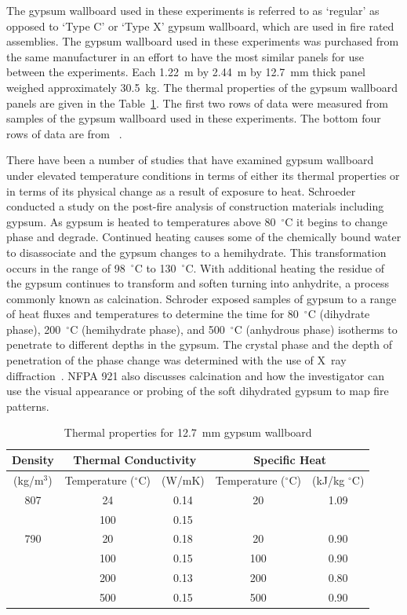 \documentclass[twoside]{uocthesis}
\begin{document}
{The gypsum wallboard used in these experiments is referred to as `regular' as opposed to `Type C' or `Type X' gypsum wallboard, which are used in fire rated assemblies. The gypsum wallboard used in these experiments was purchased from the same manufacturer in an effort to have the most similar panels for use between the experiments. Each 1.22~m by 2.44~m by 12.7~mm thick panel weighed approximately 30.5~kg.  The thermal properties of the gypsum wallboard panels are given in the Table~\ref{tab:Gypsum wallboard_Thermal_Properties}.  The first two rows of data were measured from samples of the gypsum wallboard used in these experiments.  The bottom four rows of data are from ~\cite{Gross:1985}.

There have been a number of studies that have examined gypsum wallboard under elevated temperature conditions in terms of either its thermal properties or in terms of its physical change as a result of exposure to heat.  Schroeder conducted a study on the post-fire analysis of construction materials including gypsum.  As gypsum is heated to temperatures above 80~$^\circ$C it begins to change phase and degrade.  Continued heating causes some of the chemically bound water to disassociate and the gypsum changes to a hemihydrate.  This transformation occurs in the range of 98~$^\circ$C to 130~$^\circ$C. With additional heating the residue of the gypsum continues to transform and soften turning into anhydrite, a process commonly known as calcination.  Schroder exposed samples of gypsum to a range of heat fluxes and temperatures to determine the time for 80~$^\circ$C (dihydrate phase), 200~$^\circ$C (hemihydrate phase), and 500~$^\circ$C (anhydrous phase) isotherms to penetrate to different depths in the gypsum.  The crystal phase and the depth of penetration of the phase change was determined with the use of X~\-ray diffraction~\cite{Schroeder:1999}.  NFPA 921 also discusses calcination and how the investigator can use the visual appearance or probing of the soft dihydrated gypsum to map fire patterns.

\begin{table}
	\centering
	\begin{tabular}{|c|c|c|c|c|}
		\hline Density & \multicolumn{2}{c|}{Thermal Conductivity}   & \multicolumn{2}{c|}{Specific Heat}  \\
		\hline (kg/m$^3$) & Temperature ($^{\circ}$C) & (W/mK)  & Temperature ($^{\circ}$C)  & (kJ/kg $^{\circ}$C) \\ \hline
		\hline 807  & 24 	& 0.14 	& 20	& 1.09 \\
		\hline  	& 100 	& 0.15  &  		&  \\
		\hline 790 	& 20 	& 0.18	& 20 	& 0.90 \\
		\hline  	& 100 	& 0.15 	& 100 	& 0.90 \\
		\hline  	& 200 	& 0.13 	& 200 	& 0.80 \\
		\hline  	& 500 	& 0.15 	& 500	& 0.90 \\
		\hline
		\end{tabular}
		\caption[Thermal properties for 12.7~mm gypsum wallboard]{Thermal properties for 12.7~mm gypsum wallboard}
		\label{tab:Gypsum wallboard_Thermal_Properties}
		\end{table}


}
\end{document}
